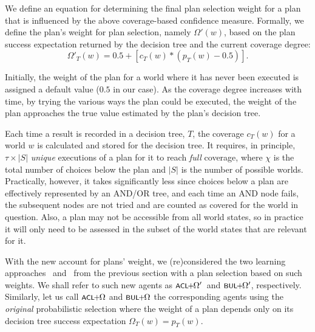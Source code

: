 We define an equation for determining the final plan selection
weight for a plan that is influenced by the above coverage-based confidence measure.
Formally, we define the plan's weight for plan selection, namely $\Omega'(w)$, based
on the plan success expectation returned by the decision tree and the current
coverage degree:
%
\begin{equation*}\label{eqn:coverage}   
\Omega'_T(w) = 0.5 + \left[  c_T(w) *  \left( p_T(w) - 0.5 \right)  \right].
\end{equation*}
	
	
Initially, the weight of the plan for a world where it has never been executed is
assigned a default value ($0.5$ in our case).
As the coverage degree increases with time, by trying the various ways the plan
could be executed, the weight of the plan approaches the true value estimated by
the plan's decision tree.


Each time a result is recorded in a decision tree, $T$, the coverage
$c_T(w)$ for a world $w$ is calculated and stored for the decision tree.
It requires, in principle, $\tau \times |S|$ \emph{unique} executions of
a plan for it to reach \emph{full} coverage, where $\chi$ is the total number of
choices below the plan and $|S|$ is the number of possible worlds. Practically,
however, it takes significantly less since choices below a plan are effectively
represented by an AND/OR tree, and each time an AND node fails, the subsequent
nodes are not tried and are counted as covered for the world in question.
Also, a plan may not be accessible from all world states, so in
practice it will only need to be assessed in the subset of the world
states that are relevant for it.


\newcommand{\CLSELA}{\mbox{$\CL\!\!+\!\!\Omega$}}
\newcommand{\CLSELB}{\mbox{$\CL\!\!+\!\!\Omega'$}}
\newcommand{\BULSELA}{\mbox{$\BUL\!\!+\!\!\Omega$}}
\newcommand{\BULSELB}{\mbox{$\BUL\!\!+\!\!\Omega'$}}

\medskip With the new account for plans' weight, we (re)considered the two
learning approaches \CL\ and \BUL\ from the previous section with a plan
selection based on such weights. We shall refer to such new agents as \CLSELB\
and \BULSELB, respectively.
Similarly, let us call $\CLSELA$ and $\BULSELA$ the corresponding agents using
the \emph{original} probabilistic selection where the weight of a plan depends
only on its decision tree success expectation $\Omega_T(w) = p_T(w)$.


